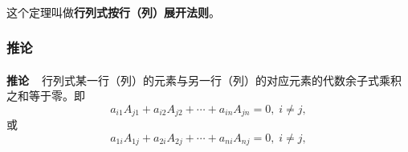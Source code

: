 \paragraph{}
这个定理叫做\textbf{行列式按行（列）展开法则}。

\subsubsection{推论}
\paragraph{}
\textbf{推论~~}行列式某一行（列）的元素与另一行（列）的对应元素的代数余子式乘积之和等于零。即
\begin{equation*}
  a_{i1}A_{j1} + a_{i2}A_{j2} + \cdots + a_{in}A_{jn} = 0, \; i \neq j,
\end{equation*}
或
\begin{equation*}
  a_{1i}A_{1j} + a_{2i}A_{2j} + \cdots + a_{ni}A_{nj} = 0, \; i \neq j,
\end{equation*}

